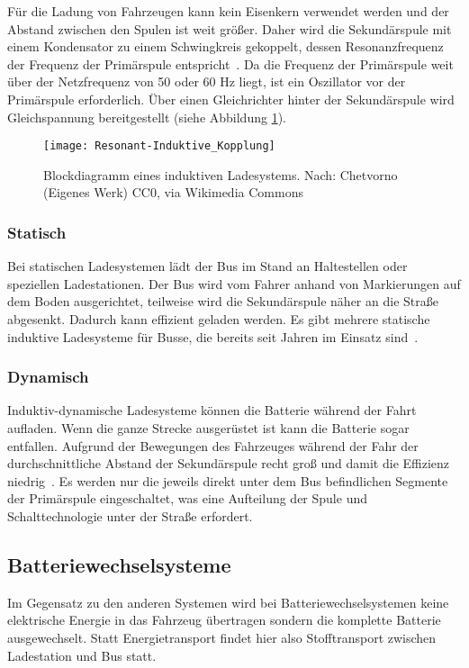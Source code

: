Für die Ladung von Fahrzeugen kann kein Eisenkern verwendet werden und der Abstand zwischen den Spulen ist weit größer. Daher wird die Sekundärspule mit einem Kondensator zu einem Schwingkreis gekoppelt, dessen Resonanzfrequenz der Frequenz der Primärspule entspricht~\cite{Kurs06072007}. Da die Frequenz der Primärspule weit über der Netzfrequenz von 50 oder 60 Hz liegt, ist ein Oszillator vor der Primärspule erforderlich. Über einen Gleichrichter hinter der Sekundärspule wird Gleichspannung bereitgestellt (siehe Abbildung \ref{abb_ResIndKopplung}).

\begin{figure}\centering
	\texttt{[image: Resonant-Induktive\_Kopplung]}
	\caption[Blockdiagramm eines induktiven Ladesystems]{Blockdiagramm eines induktiven Ladesystems. Nach: Chetvorno (Eigenes Werk) CC0, via Wikimedia Commons}
	\label{abb_ResIndKopplung}
\end{figure}

\subsubsection{Statisch}
Bei statischen Ladesystemen lädt der Bus im Stand an Haltestellen oder speziellen Ladestationen. Der Bus wird vom Fahrer anhand von Markierungen auf dem Boden ausgerichtet, teilweise wird die Sekundärspule näher an die Straße abgesenkt. Dadurch kann effizient geladen werden. Es gibt mehrere statische induktive Ladesysteme für Busse, die bereits seit Jahren im Einsatz sind~\cite{WeIPT}.

\subsubsection{Dynamisch}
Induktiv-dynamische Ladesysteme können die Batterie während der Fahrt aufladen. Wenn die ganze Strecke ausgerüstet ist kann die Batterie sogar entfallen. Aufgrund der Bewegungen des Fahrzeuges während der Fahr der durchschnittliche Abstand der Sekundärspule recht groß und damit die Effizienz niedrig~\cite{5618092}. Es werden nur die jeweils direkt unter dem Bus befindlichen Segmente der Primärspule eingeschaltet, was eine Aufteilung der Spule und Schalttechnologie unter der Straße erfordert.

\subsection{Batteriewechselsysteme}
Im Gegensatz zu den anderen Systemen wird bei Batteriewechselsystemen keine elektrische Energie in das Fahrzeug übertragen sondern die komplette Batterie ausgewechselt. Statt Energietransport findet hier also Stofftransport zwischen Ladestation und Bus statt. 


